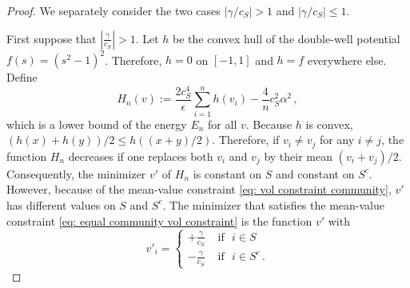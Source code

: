 \documentclass[11pt]{amsart}
\def\ep{\epsilon}
\numberwithin{equation}{section}
\begin{document}
\begin{proof}

We separately consider the two cases $\left|{\gamma}/{c_S}\right| > 1$ and $\left|{\gamma}/{c_S}\right| \leq 1$. 

First suppose that $\left|\frac{\gamma}{c_S}\right| > 1$. 
Let $h$ be the convex hull of the double-well potential $f(s) = (s^2 - 1)^2$. Therefore, $h = 0$ on $[-1,1]$ and $h = f$ everywhere else. Define 
\begin{equation*}
    H_n(v) := \frac{2 c_S^4}{\ep} \sum_{i = 1}^n h(v_i) - \frac{4}{n} c_S^2 \alpha^2\,,
\end{equation*}
which is a lower bound of the energy $E_n$ for all $v$.
Because $h$ is convex, $(h(x) + h(y))/2 \leq h\left((x + y)/2\right)$. Therefore, if $v_i \neq v_j$ for any $i \neq j$, the function $H_n$ decreases if one replaces both $v_i$ and $v_j$ by their mean $(v_i + v_j)/2$.
Consequently, the minimizer $v'$ of $H_n$ is constant on $S$ and constant on $S^c$. However, because of the {mean-value constraint} \eqref{eq: vol constraint community}, $v'$ has different values on $S$ and $S^c$.
The minimizer that satisfies the {mean-value constraint} \eqref{eq: equal community vol constraint} is the function $v'$ with
\begin{equation}\label{eq: v'}
    v'_i = \begin{cases}
        +\frac{\gamma}{c_S} &\text{ if } \,\, i\in S 
        \\
        -\frac{\gamma}{c_S} &\text{ if } \,\, i\in S^c   \,.  
    \end{cases}
\end{equation}



\end{proof}
\end{document}
